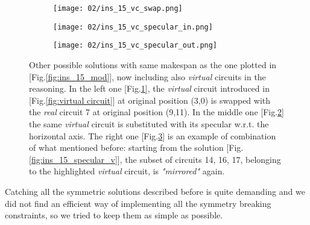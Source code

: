         \begin{figure}[H]
            \centering
            \begin{subfigure}[b]{0.3\textwidth}
                \centering 
                \texttt{[image: 02/ins\_15\_vc\_swap.png]}
                \caption{}
                \label{fig:vc_swap}
            \end{subfigure}
            \hfill
            \begin{subfigure}[b]{0.3\textwidth}
                \centering
                \texttt{[image: 02/ins\_15\_vc\_specular\_in.png]}
                \caption{}
                \label{fig:vc_specular_in}
            \end{subfigure}
            \hfill
            \begin{subfigure}[b]{0.3\textwidth}
                \centering
                \texttt{[image: 02/ins\_15\_vc\_specular\_out.png]}
                \caption{}
                \label{fig:vc_specular_out}
            \end{subfigure}
            \caption{
                Other possible solutions with same makespan as the one plotted in [Fig.\ref{fig:ins_15_mod}],
                now including also \textit{virtual} circuits in the reasoning.
                In the left one [Fig.\ref{fig:vc_swap}], the \textit{virtual} circuit introduced in [Fig.\ref{fig:virtual circuit}]
                at original position (3,0) is swapped with the \textit{real} circuit 7 at original position (9,11).
                In the middle one [Fig.\ref{fig:vc_specular_in}] the same \textit{virtual} circuit is substituted with 
                its specular w.r.t. the horizontal axis.
                The right one [Fig.\ref{fig:vc_specular_out}] is an example of combination of what mentioned before:
                starting from the solution [Fig.\ref{fig:ins_15_specular_v}], the subset of circuits 14, 16, 17, belonging to 
                the highlighted \textit{virtual} circuit, is \textit{"mirrored"} again.
            }
            \label{fig:symmetry_vc}
        \end{figure}

        Catching all the symmetric solutions described before is quite demanding and we did not find an 
        efficient way of implementing all the symmetry breaking constraints, so we tried to keep them as simple 
        as possible.


